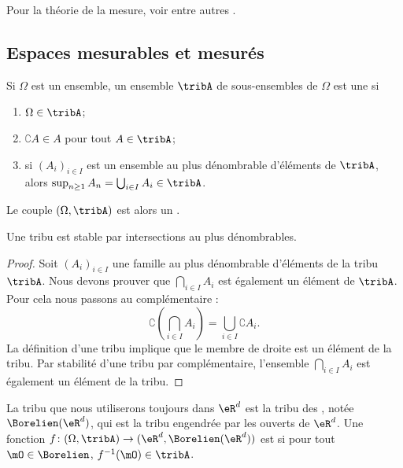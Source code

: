Pour la théorie de la mesure, voir entre autres \cite{FubiniBMauray,ProbaDanielLi}.

\subsection{Espaces mesurables et mesurés}

\begin{definition}
    Si \( \Omega\) est un ensemble, un ensemble \( \tribA\) de sous-ensembles de \( \Omega\) est une  si
    \begin{enumerate}
        \item
            \( \Omega\in\tribA\);
        \item
            \( \complement A\in A\) pour tout \( A\in\tribA\);
        \item
            si \( (A_i)_{i\in I}\) est un ensemble au plus dénombrable d'éléments de \( \tribA\), alors \( \sup_{n\geq 1}A_n=\bigcup_{i\in I}A_i\in\tribA\).
    \end{enumerate}
    Le couple \( (\Omega,\tribA)\) est alors un .
\end{definition}

\begin{lemma}
    Une tribu est stable par intersections au plus dénombrables.
\end{lemma}

\begin{proof}
    Soit \( (A_i)_{i\in I}\) une famille au plus dénombrable d'éléments de la tribu \( \tribA\). Nous devons prouver que \( \bigcap_{i\in I}A_i\) est également un élément de \( \tribA\). Pour cela nous passons au complémentaire :
    \begin{equation}
        \complement\left( \bigcap_{i\in I}A_i \right)=\bigcup_{i\in I}\complement A_i.
    \end{equation}
    La définition d'une tribu implique que le membre de droite est un élément de la tribu. Par stabilité d'une tribu par complémentaire, l'ensemble \( \bigcap_{i\in I}A_i\) est également un élément de la tribu.
\end{proof}

La tribu que nous utiliserons toujours dans \( \eR^d\) est la tribu des , notée \( \Borelien(\eR^d)\), qui est la tribu engendrée par les ouverts de \( \eR^d\). Une fonction \( f\colon (\Omega,\tribA)\to (\eR^d,\Borelien(\eR^d))\) est  si pour tout \( \mO\in\Borelien\), \( f^{-1}(\mO)\in\tribA\).


